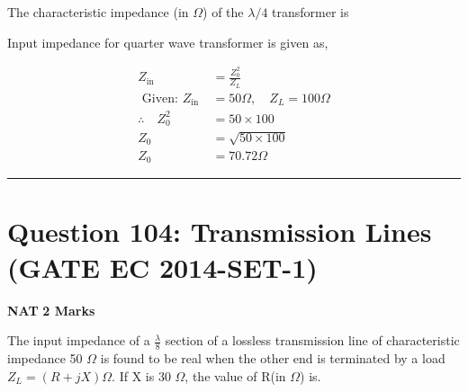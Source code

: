 \documentclass[11pt,a4paper]{article}
\begin{document}
  The characteristic impedance (in $\Omega$) of the $\lambda/4$  transformer is \underline{\hspace{1.5cm}}


\begin{tcolorbox}[solbox, title=Detailed Solution -- Question 103]
Input impedance for quarter wave transformer is given as,

\[
\begin{aligned} Z_{\text {in }}&=\frac{Z_{0}^{2}}{Z_{L}} \\ \text { Given: } Z_{\text {in }}&=50 \Omega, \quad Z_{L}=100 \Omega\\ \therefore \quad Z_{0}^{2}&=50 \times 100 \\ Z_{0}&=\sqrt{50 \times 100} \\ Z_{0}&=70.72 \Omega \end{aligned}
\]
\end{tcolorbox}

\vspace{1.5em}
\hrule
\vspace{1.5em}

\section*{Question 104: Transmission Lines (GATE EC 2014-SET-1)}
\noindent \textbf{\color{primary}NAT} \hfill \textbf{\color{secondary}2 Marks}


\noindent The input impedance of a $\frac{\lambda }{8}$ section of a lossless transmission line of characteristic impedance 50 $\Omega$ is found to be real when the other end is terminated by a load $Z_{L}=(R+jX)\Omega$. If X is  30 $\Omega$, the value of R(in $\Omega$) is\underline{\hspace{1.5cm}}.
\end{document}
